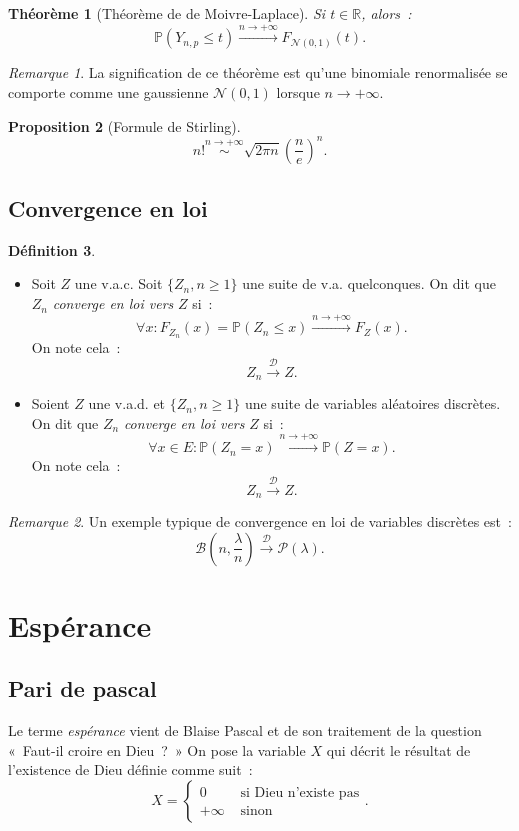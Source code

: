\documentclass{article}
\renewcommand{\P}{\mathbb P}
\newcommand{\R}{\mathbb R}
\newcommand{\Nzu}{\mathcal N(0, 1)}  %
\newcommand{\convl}{\stackrel{\mathcal D}\to}  %
\newtheorem{thm}{Théorème}[section]
\newtheorem{prp}[thm]{Proposition}
\theoremstyle{definition}
\newtheorem{déf}[thm]{Définition}
\theoremstyle{remark}
\newtheorem*{rmq}{Remarque}
\begin{document}
		\begin{thm}[Théorème de de Moivre-Laplace] Si $t \in \R$, alors~:
		\[\P(Y_{n, p} \leq t) \stackrel{n \to +\infty}{\to}F_{\Nzu}(t).\]
		\end{thm}

		\begin{rmq} La signification de ce théorème est qu'une binomiale renormalisée se comporte comme une gaussienne $\Nzu$ lorsque $n \to +\infty$. \end{rmq}

		\begin{prp}[Formule de Stirling] \[n! \stackrel{n \to +\infty}\sim \sqrt{2\pi n}\left(\frac ne\right)^n.\] \end{prp}
	
	\subsection{Convergence en loi}
		\begin{déf}~
		\begin{itemize}
			\item Soit $Z$ une v.a.c. Soit $\{Z_n, n \geq 1\}$ une suite de v.a. quelconques. On dit que $Z_n$ \emph{converge en loi vers} $Z$ si~:
			      \[\forall x : F_{Z_n}(x) = \P(Z_n \leq x) \stackrel{n \to +\infty}\to F_Z(x).\]
			      On note cela~:
			      \[Z_n \convl Z.\]

			\item Soient $Z$ une v.a.d. et $\{Z_n, n \geq 1\}$ une suite de variables aléatoires discrètes. On dit que $Z_n$ \emph{converge en loi vers}
			      $Z$ si~:
			      \[\forall x \in E : \P(Z_n = x) \stackrel{n \to +\infty}\to \P(Z = x).\]
			      On note cela~:
				  \[Z_n \convl Z.\]
		\end{itemize}
		\end{déf}

		\begin{rmq} Un exemple typique de convergence en loi de variables discrètes est~:
		\[\mathcal B\left(n, \frac \lambda{n}\right) \convl \mathcal P(\lambda).\]
		\end{rmq}

\newpage
\section{Espérance}
	\subsection{Pari de pascal}
		Le terme \emph{espérance} vient de Blaise Pascal et de son traitement de la question «~Faut-il croire en Dieu~?~» On pose la variable $X$ qui
		décrit le résultat de l'existence de Dieu définie comme suit~:
		\[X = \begin{cases}0 &\text{ si Dieu n'existe pas} \\+\infty &\text{ sinon}\end{cases}.\]
\end{document}
